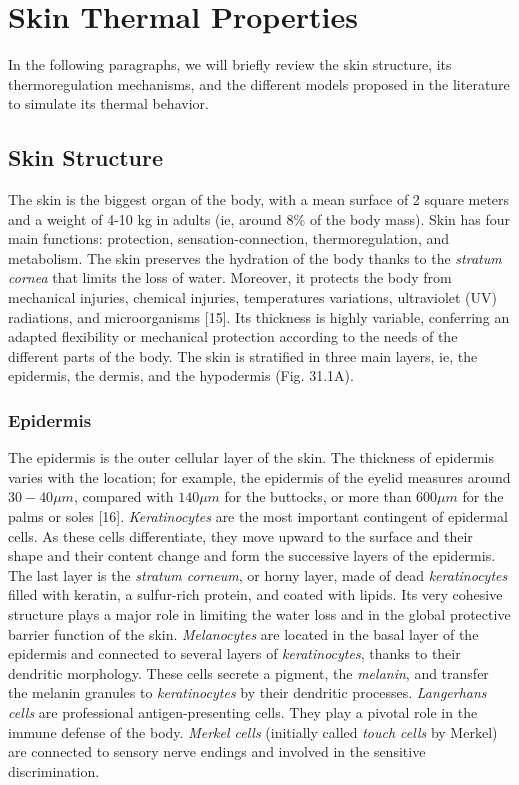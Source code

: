 
\section*{Skin Thermal Properties}

In the following paragraphs, we will briefly review the skin structure, its
thermoregulation mechanisms, and the different models proposed in the literature
to simulate its thermal behavior.

\subsection*{Skin Structure}

The skin is the biggest organ of the body, with a mean surface of 2 square meters
and a weight of 4-10 kg in adults (ie, around 8\% of the body mass). Skin has four
main functions: protection, sensation-connection, thermoregulation, and metabolism.
The skin preserves the hydration of the body thanks to the \textit{stratum cornea} that
limits the loss of water. Moreover, it protects the body from mechanical injuries,
chemical injuries, temperatures variations, ultraviolet (UV) radiations, and
microorganisms [15]. Its thickness is highly variable, conferring an adapted
flexibility or mechanical protection according to the needs of the different parts
of the body. The skin is stratified in three main layers, ie, the epidermis, the
dermis, and the hypodermis (Fig. 31.1A).

\subsubsection*{Epidermis}

The epidermis is the outer cellular layer of the skin. The thickness of epidermis
varies with the location; for example, the epidermis of the eyelid measures around
$30-40 \mu m$, compared with $140 \mu m$ for the buttocks, or more than $600 \mu m$
for the palms or soles [16]. \textit{Keratinocytes} are the most important contingent of
epidermal cells. As these cells differentiate, they move upward to the surface and
their shape and their content change and form the successive layers of the
epidermis. The last layer is the \textit{stratum corneum}, or horny layer, made of dead
\textit{keratinocytes} filled with keratin, a sulfur-rich protein, and coated with lipids.
Its very cohesive structure plays a major role in limiting the water loss and in
the global protective barrier function of the skin. \textit{Melanocytes} are located
in the basal layer of the epidermis and connected to several layers of \textit{keratinocytes},
thanks to their dendritic morphology. These cells secrete a pigment, the \textit{melanin},
and transfer the melanin granules to \textit{keratinocytes} by their dendritic
processes. \textit{Langerhans cells} are professional antigen-presenting cells. They
play a pivotal role in the immune defense of the body. \textit{Merkel cells} (initially
called \textit{touch cells} by Merkel) are connected to sensory nerve endings and
involved in the sensitive discrimination.
